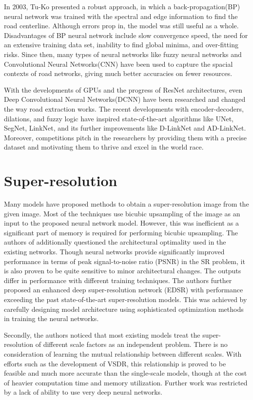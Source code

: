 In 2003, Tu-Ko presented a robust approach, in which a back-propagation(BP) neural network was trained with the spectral and edge information to find the road centerline. Although errors prop in, the model was still useful as a whole. Disadvantages of BP neural network include slow convergence speed, the need for an extensive training data set, inability to find global minima, and over-fitting risks. Since then, many types of neural networks like fuzzy neural networks \cite{mokhtarzade2008automatic} and Convolutional Neural Networks(CNN) have been used to capture the spacial contexts of road networks, giving much better accuracies on fewer resources.

With the developments of GPUs and the progress of ResNet architectures, even Deep Convolutional Neural Networks(DCNN) have been researched and changed the way road extraction works. The recent developments with encoder-decoders, dilations, and fuzzy logic have inspired state-of-the-art algorithms like UNet, SegNet, LinkNet, and its further improvements like D-LinkNet and AD-LinkNet. Moreover, competitions pitch in the researchers by providing them with a precise dataset and motivating them to thrive and excel in the world race.


\section{Super-resolution}
Many models have proposed methods to obtain a super-resolution image from the given image. Most of the techniques use bicubic upsampling of the image as an input to the proposed neural network model. However, this was inefficient as a significant part of memory is required for performing bicubic upsampling. The authors of %
additionally questioned the architectural optimality used in the existing networks. Though neural networks provide significantly improved performance in terms of peak signal-to-noise ratio (PSNR) in the SR problem, it is also proven to be quite sensitive to minor architectural changes. The outputs differ in performance with different training techniques. The authors further proposed an enhanced deep super-resolution network (EDSR) with performance exceeding the past state-of-the-art super-resolution models. This was achieved by carefully designing model architecture using sophisticated optimization methods in training the neural networks.

Secondly, the authors noticed that most existing models treat the super-resolution of different scale factors as an independent problem. There is no consideration of learning the mutual relationship between different scales. With efforts such as the development of VSDR, this relationship is proved to be feasible and much more accurate than the single-scale models, though at the cost of heavier computation time and memory utilization. Further work was restricted by a lack of ability to use very deep neural networks.

